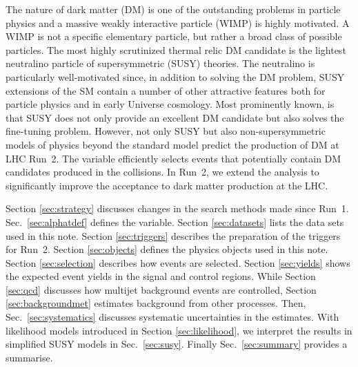 The nature of dark matter (DM) is one of the outstanding problems in
particle physics and a massive weakly interactive particle (WIMP) is
highly motivated. A WIMP is not a specific elementary particle, but
rather a broad class of possible particles. The most highly
scrutinized thermal relic DM candidate is the lightest neutralino
particle of supersymmetric (SUSY) theories. The neutralino is
particularly well-motivated since, in addition to solving the DM
problem, SUSY extensions of the SM contain a number of other
attractive features both for particle physics and in early Universe
cosmology. Most prominently known, is that SUSY does not only provide
an excellent DM candidate but also solves the fine-tuning problem.
However, not only SUSY but also non-supersymmetric models of physics
beyond the standard model predict the production of DM at LHC Run~2.
The \alphat variable efficiently selects events that potentially
contain DM candidates produced in the collisions. In Run~2, we extend
the \alphat analysis to significantly improve the acceptance to dark
matter production at the LHC. 

Section \ref{sec:strategy} discusses changes in the search methods
made since Run~1. Sec.~\ref{sec:alphatdef} defines the \alphat
variable. Section \ref{sec:datasets} lists the data sets used in this
note. Section \ref{sec:triggers} describes the preparation of the
triggers for Run~2. Section \ref{sec:objects} defines the physics
objects used in this note. Section \ref{sec:selection} describes how
events are selected. Section \ref{sec:yields} shows the expected event
yields in the signal and control regions. While Section \ref{sec:qcd}
discusses how multijet background events are controlled, Section
\ref{sec:backgroundmet} estimates background from other processes.
Then, Sec.~\ref{sec:systematics} discusses systematic uncertainties in
the estimates. With likelihood models introduced in Section
\ref{sec:likelihood}, we interpret the results in simplified SUSY
models in Sec.~\ref{sec:susy}. Finally Sec.~\ref{sec:summary} provides
a summarise.

